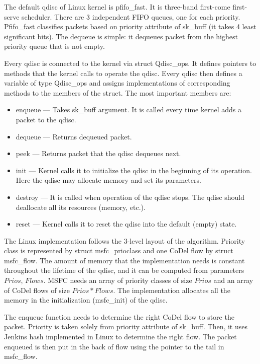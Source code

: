 The default qdisc of Linux kernel is pfifo\_fast. It is three-band first-come first-serve scheduler. There are 3 independent FIFO queues, one for each priority. Pfifo\_fast classifies packets based on priority attribute of sk\_buff (it takes 4 least significant bits). The dequeue is simple: it dequeues packet from the highest priority queue that is not empty.

Every qdisc is connected to the kernel via struct Qdisc\_ops. It defines pointers to methods that the kernel calls to operate the qdisc. Every qdisc then defines a variable of type Qdisc\_ops and assigns implementations of corresponding methods to the members of the struct. The most important members are:
\begin{itemize}
	\item enqueue --- Takes sk\_buff argument. It is called every time kernel adds a packet to the qdisc.
	\item dequeue --- Returns dequeued packet.
	\item peek --- Returns packet that the qdisc dequeues next.
	\item init --- Kernel calls it to initialize the qdisc in the beginning of its operation. Here the qdisc may allocate memory and set its parameters.
	\item destroy --- It is called when operation of the qdisc stops. The qdisc should deallocate all its resources (memory, etc.).
	\item reset --- Kernel calls it to reset the qdisc into the default (empty) state.
\end{itemize}

The Linux implementation follows the 3-level layout of the algorithm. Priority class is represented by struct msfc\_prioclass and one CoDel flow by struct msfc\_flow. The amount of memory that the implementation needs is constant throughout the lifetime of the qdisc, and it can be computed from parameters $Prios$, $Flows$. MSFC needs an array of priority classes of size $Prios$ and an array of CoDel flows of size $Prios * Flows$. The implementation allocates all the memory in the initialization (msfc\_init) of the qdisc.

The enqueue function needs to determine the right CoDel flow to store the packet. Priority is taken solely from priority attribute of sk\_buff. Then, it uses Jenkins hash implemented in Linux to determine the right flow. The packet enqueued is then put in the back of flow using the pointer to the tail in msfc\_flow. 

